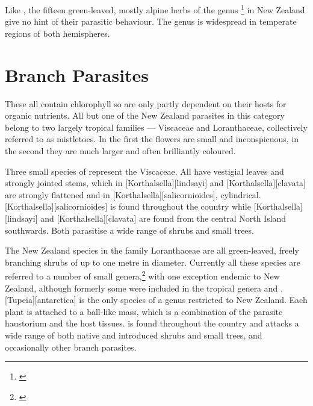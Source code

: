 Like , the fifteen green-leaved, mostly alpine herbs of the genus \footnote{\cite{philipson1959some}} in New Zealand give no hint of their parasitic behaviour.
The genus is widespread in temperate regions of both hemispheres.

\section{Branch Parasites}

These all contain chlorophyll so are only partly dependent on their hosts for organic nutrients.
All but one of the New Zealand parasites in this category belong to two largely tropical families --- Viscaceae and Loranthaceae, collectively referred to as mistletoes.
In the first the flowers are small and inconspicuous, in the second they are much larger and often brilliantly coloured.

Three small species of  represent the Viscaceae.
All have vestigial leaves and strongly jointed stems, which in [Korthalsella][lindsayi] and [Korthalsella][clavata] are strongly flattened and in [Korthalsella][salicornioides], cylindrical. [Korthalsella][salicornioides] is found throughout the country while [Korthalsella][lindsayi] and [Korthalsella][clavata] are found from the central North Island southwards.
Both parasitise a wide range of shrubs and small trees.

The New Zealand species in the family Loranthaceae are all green-leaved, freely branching shrubs of up to one metre in diameter.
Currently all these species are referred to a number of small genera,\footnote{\cite{barlow1966revision}} with one exception endemic to New Zealand, although formerly some were included in the tropical genera  and .  [Tupeia][antarctica] is the only species of a genus restricted to New Zealand.
Each plant is attached to a ball-like mass, which is a combination of the parasite haustorium and the host tissues.  is found throughout the country and attacks a wide range of both native and introduced shrubs and small trees, and occasionally other branch parasites.

